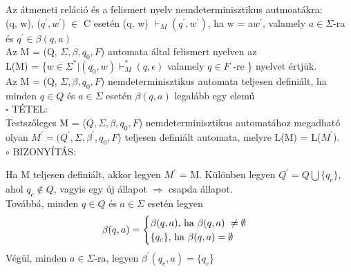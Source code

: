 \documentclass{article}
\begin{document}
    \noindent Az átmeneti reláció és a felismert nyelv nemdeterminisztikus autmoatákra: \\
    \indent (q, w), ($q^{'}, w^{'}$) $ \in $ C esetén (q, w) $ \vdash_M (q^{'}, w^{'})$, ha w = a$w^{'}$, valamely $ a \in \Sigma $-ra  és $ q^{'} \in \beta(q, a) $
    \\ \newline
    \noindent Az M = (Q, $ \Sigma, \beta, q_0, F $) automata által felismert nyelven az \\
    \indent L(M) = \{$ w \in \Sigma^* | (q_0, w) \vdash_M^* (q, \epsilon ) $ valamely $ q \in F $ -re \} nyelvet értjük. \\ \newline
    \indent Az M = (Q, $ \Sigma, \beta, q_0, F $) nemdeterminisztikus automata teljesen definiált, ha minden $ q \in Q$ és $ a \in \Sigma $ esetén $ \beta(q, a) $ legalább egy elemű \\ \newline
    $ \square $ TÉTEL: \\
    Testszőleges M = ($ Q, \Sigma, \beta, q_0, F $) nemdeterminisztikus automatához megadható olyan $ M^{'} = (Q^{'}, \Sigma, \beta^{'}, q_0, F $) teljesen definiált automata, melyre L(M) = L($M^{'}$). \\
    \newline \indent $ \circ $ BIZONYÍTÁS:
    \begin{adjustwidth}{1cm}{}
        \indent \indent Ha M teljesen definiált, akkor legyen $M^{'}$ = M. Különben legyen $ Q^{'} = Q \bigcup \{q_c\} $, ahol $ q_c \notin Q $, vagyis egy új állapot $ \Rightarrow $ csapda állapot. \\
        \indent Továbbá, minden $q \in Q $ és $ a \in \Sigma $ esetén legyen \\
        \begin{equation}
            \beta(q,a) = 
           \begin{cases}
                \text{$ \beta(q,a) $, ha $ \beta(q,a) \ne \emptyset$} \\
                \text{$ \{q_c\} $, ha $ \beta(q, a) = \emptyset $}
           \end{cases} 
        \end{equation}
        \indent Végül, minden  $ a \in  \Sigma $-ra, legyen $ \beta^{'}(q_c, a) = \{ q_c $\}
    \end{adjustwidth}
\end{document}
